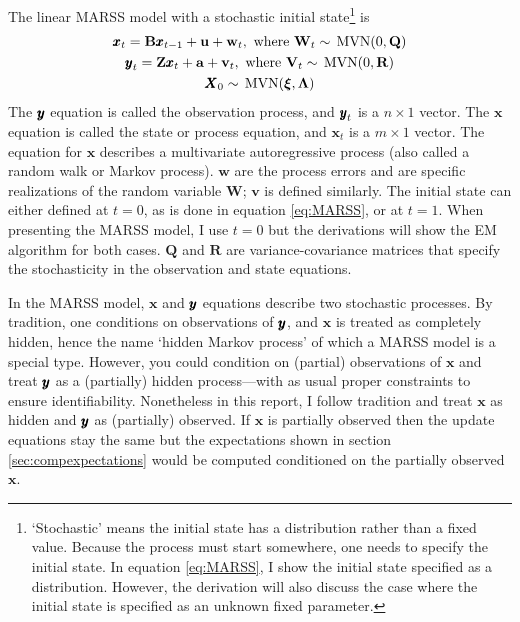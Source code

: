 \documentclass[]{article}
\def\xixi{\mbox{\boldmath $\xi$}}
\def\LAM{\mbox{\boldmath $\Lambda$}}
\def\UPS{\mbox{\boldmath $\Upsilon$}}
\def\XI{\mbox{\boldmath $\Xi$}}
\def\BB{\mbox{$\mathbf B$}}	\def\bb{\mbox{$\mathbf b$}} \def\Bb{\mbox{$\mathbf J$}} \def\Ba{\mbox{$\mathbf L$}} \def\Bm{\UPS}
\def\MVN{\,\textup{\textrm{MVN}}}
\def\QQ{\mbox{$\mathbf Q$}}	 \def\qq{\mbox{$\mathbf q$}} \def\Qb{\mbox{$\mathbf G$}}  \def\Qm{\mathbb{Q}}
\def\RR{\mbox{$\mathbf R$}}	 \def\rr{\mbox{$\mathbf r$}} \def\Rb{\mbox{$\mathbf H$}}	\def\Rm{\mathbb{R}}
\def\VV{\mbox{$\mathbf V$}}	\def\vv{\mbox{$\mathbf v$}}
\def\WW{\mbox{$\mathbf W$}}	\def\ww{\mbox{$\mathbf w$}}
\def\XX{\mbox{$\pmb{X}$}}	\def\xx{\mbox{$\pmb{x}$}}
\def\ZZ{\mbox{$\mathbf Z$}}	\def\zz{\mbox{$\mathbf z$}}	\def\Zb{\mbox{$\mathbf M$}} \def\Za{\mbox{$\mathbf N$}} \def\Zm{\XI}
\begin{document}
The linear MARSS model with a stochastic initial state\footnote{`Stochastic' means the initial state has a distribution rather than a fixed value. Because the process must start somewhere, one needs to specify the initial state. In equation \ref{eq:MARSS}, I show the initial state specified as a distribution.  However, the derivation will also discuss the case where the initial state is specified as an unknown fixed parameter.} is
\begin{subequations}\label{eq:MARSS}
\begin{gather}
\xx_t = \BB\xx_{t-1} + \uu + \ww_t, \text{ where } \WW_t \sim \MVN(0,\QQ) \label{eq:MARSSx}\\
\yy_t = \ZZ\xx_t + \aa + \vv_t, \text{ where } \VV_t \sim \MVN(0,\RR) \label{eq:MARSSy}\\
\XX_0 \sim \MVN(\xixi,\LAM) \label{eq:MARSSx1}
\end{gather}
\end{subequations}
The $\mbox{$\pmb{y}$}$ equation is called the observation process, and $\mbox{$\pmb{y}$}_t$ is a $n \times 1$ vector.  The $\xx$ equation is called the state or process equation, and $\xx_t$ is a $m \times 1$ vector. The equation for $\xx$ describes a multivariate autoregressive process (also called a random walk or Markov process). $\ww$ are the process errors and are specific realizations of the random variable $\WW$; $\vv$ is defined similarly.  The initial state can either defined at $t=0$, as is done in equation \ref{eq:MARSS}, or at $t=1$.  When presenting the MARSS model, I use $t=0$ but the derivations will show the EM algorithm for both cases. $\QQ$ and $\RR$ are variance-covariance matrices that specify the stochasticity in the observation and state equations.  

In the MARSS model, $\xx$ and $\mbox{$\pmb{y}$}$ equations describe two stochastic processes.  By tradition, one conditions on observations of $\mbox{$\pmb{y}$}$, and $\xx$ is treated as completely hidden, hence the name `hidden Markov process' of which a MARSS model is a special type.  However, you could condition on (partial) observations of $\xx$ and treat $\mbox{$\pmb{y}$}$ as a (partially) hidden process---with as usual proper constraints to ensure identifiability.  Nonetheless in this report, I follow tradition and treat $\xx$ as hidden and $\mbox{$\pmb{y}$}$ as (partially) observed.  If $\xx$ is partially observed then the update equations stay the same but the expectations shown in section \ref{sec:compexpectations} would be computed conditioned on the partially observed $\xx$.
\end{document}
